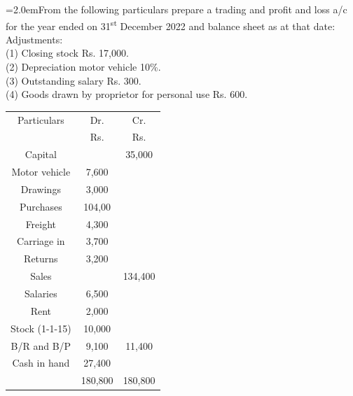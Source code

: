 \documentclass[11pt,a4paper]{article}
\newcommand{\lqn}[2]{\Needspace{6\baselineskip}\par\medskip\noindent\hangindent=2.0em\hangafter=1\makebox[2.0em][l]{\textbf{#1.}}#2\par}
\begin{document}
\lqn{101}{From the following particulars prepare a trading and profit and loss a/c for the year ended on 31\textsuperscript{st} December 2022 and balance sheet as at that date: Adjustments:\\
(1) Closing stock Rs. 17,000.\\
(2) Depreciation motor vehicle 10\%.\\
(3) Outstanding salary Rs. 300.\\
(4) Goods drawn by proprietor for personal use Rs. 600.\par
\par\smallskip\noindent\hspace*{1.2em}\begin{tabular}{|ccc|}
\hline
Particulars & Dr. & Cr. \\
 & Rs. & Rs. \\
Capital &  & 35,000 \\
Motor vehicle & 7,600 &  \\
Drawings & 3,000 &  \\
Purchases & 104,00 &  \\
Freight & 4,300 &  \\
Carriage in & 3,700 &  \\
Returns & 3,200 &  \\
Sales &  & 134,400 \\
Salaries & 6,500 &  \\
Rent & 2,000 &  \\
Stock (1-1-15) & 10,000 &  \\
B/R and B/P & 9,100 & 11,400 \\
Cash in hand & 27,400 &  \\
 & 180,800 & 180,800 \\
\hline
\end{tabular}\par\smallskip
}
\end{document}
